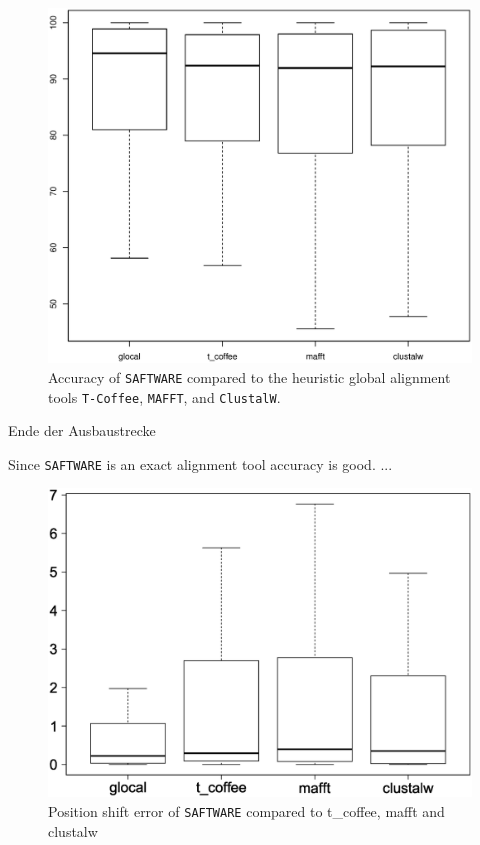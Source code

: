 \documentclass[a4paper,10pt]{article}
\newcommand{\TODO}[1]{\begingroup\color{red}#1\endgroup}
\newcommand{\SAFTWARE}{\TODO{\texttt{SAFTWARE}}}
\begin{document}
{\begin{figure}
  \begin{center}
    \includegraphics[width=1\columnwidth]{ac.eps}
  \end{center}
  \label{fig:ac}
  \caption{Accuracy of \SAFTWARE{} compared to the heuristic global
    alignment tools \texttt{T-Coffee}, \texttt{MAFFT}, and
    \texttt{ClustalW}.}
\end{figure}

\TODO{Ende der Ausbaustrecke}



Since \SAFTWARE{} is an exact alignment tool accuracy is good. ... 

\begin{figure}
  \begin{center}
    \includegraphics[width=1\columnwidth]{pse_compued_correctly.eps}
  \end{center}
  \label{fig:pse}
  \caption{Position shift error of \SAFTWARE{} compared to t\_coffee, mafft and clustalw}
\end{figure}

}
\end{document}
